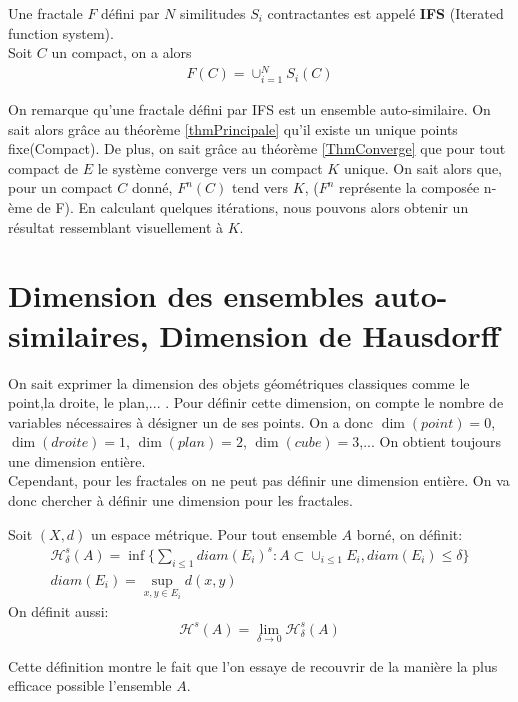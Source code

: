 \documentclass[a4paper, 12pt]{report}
\begin{document}
			\begin{definition}
				Une fractale $F$ défini par $N$ similitudes $S_i$ contractantes est appelé \textbf{IFS} (Iterated function system).\\
				Soit $C$ un compact, on a alors
				\begin{align*}
					F(C)=\cup^N_{i=1}S_i(C)
				\end{align*}

			\end{definition}
			
			\hspace{.7 cm}On remarque qu'une fractale défini par IFS est un ensemble auto-similaire. On sait alors grâce au théorème \ref{thmPrincipale} qu'il existe un unique points fixe(Compact). De plus, on sait grâce au théorème \ref{ThmConverge} que pour tout compact de $E$ le système converge vers un compact $K$ unique. On sait alors que, pour un compact $C$ donné, $F^n(C)$ tend vers $K$, ($F^n$ représente la composée n-ème de F). En calculant quelques itérations, nous pouvons alors obtenir un résultat ressemblant visuellement à $K$.

	\chapter{\bf Dimension des ensembles auto-similaires, Dimension de Hausdorff}
		On sait exprimer la dimension des objets géométriques classiques comme le point,la droite, le plan,... . Pour définir cette dimension, on compte le nombre de variables nécessaires à désigner un de ses points. On a donc $\dim(point)=0$, $\dim(droite)=1$, $\dim(plan)=2$, $\dim(cube)=3$,... On obtient toujours une dimension entière.\\
		Cependant, pour les fractales on ne peut pas définir une dimension entière. On va donc chercher à définir une dimension pour les fractales.
			
			\begin{definition}
				Soit $(X,d)$ un espace métrique. Pour tout ensemble $A$ borné, on définit:
				\begin{align*}
					\mathscr{H}^s_\delta(A)=\inf\{\sum_{i\leq1}diam(E_i)^s:A\subset\cup_{i\leq1}E_i,diam(E_i)\leq\delta\}\\
					diam(E_i)=\sup_{x,y\in E_i}d(x,y)
					\end{align*}
				On définit aussi:
				\begin{equation*}
					\mathscr{H}^s(A)=\lim_{\delta\rightarrow0}\mathscr{H}^s_\delta(A)
				\end{equation*}
			\end{definition}
			\hspace{0.7 cm} Cette définition montre le fait que l'on essaye de recouvrir de la manière la plus efficace possible l'ensemble $A$.
			
\end{document}
